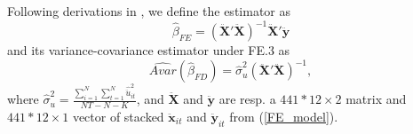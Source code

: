 \documentclass[11pt]{article}
\begin{document}
Following derivations in \cite{Wooldrige_2010_10}, we define the estimator as
\begin{equation}
    \widehat{\beta}_{FE}=(\ddot{\textbf{X}}'\ddot{\textbf{X}})^{-1}\ddot{\textbf{X}}'\ddot{\textbf{y}}
\end{equation}
and its variance-covariance estimator under FE.3 as
\begin{equation}
    \widehat{Avar}(\widehat{\beta}_{FD}) = \hat{\sigma}_u^2\left(\ddot{\textbf{X}}'\ddot{\textbf{X}}\right)^{-1}, 
\end{equation}
where $\hat{\sigma}_u^2=\frac{\sum_{i=1}^N\sum_{t=1}^N\hat{\ddot{u}}_{it}^2}{NT-N-K}$, and $\ddot{\textbf{X}}$ and $\ddot{\textbf{y}}$ are resp. a $441*12\times 2$ matrix and $441*12\times1$ vector of stacked $\ddot{\textbf{x}}_{it}$ and $\ddot{\textbf{y}}_{it}$ from (\ref{FE_model}). 
\end{document}

